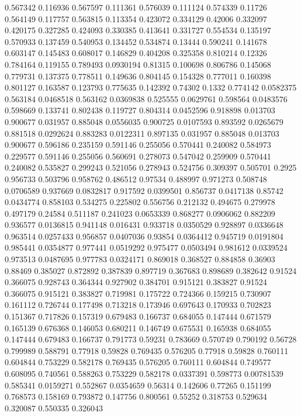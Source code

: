 0.567342 0.116936
0.567597 0.111361
0.576039 0.111124
0.574339 0.11726
0.564149 0.117757
0.563815 0.113354
0.423072 0.334129
0.42006 0.332097
0.420175 0.327285
0.424093 0.330385
0.413641 0.331727
0.554534 0.135197
0.570933 0.137459
0.540953 0.134452
0.534874 0.13444
0.590241 0.141678
0.603147 0.145483
0.608017 0.146829
0.404208 0.325358
0.810214 0.12326
0.784164 0.119155
0.789493 0.0930194
0.81315 0.100698
0.806786 0.145068
0.779731 0.137375
0.778511 0.149636
0.804145 0.154328
0.777011 0.160398
0.801127 0.163587
0.123793 0.775635
0.142392 0.74302
0.1332 0.774142
0.0582375 0.563184
0.0468518 0.563162
0.0369838 0.525555
0.0629761 0.598564
0.0483576 0.598669
0.133741 0.802438
0.119727 0.804314
0.0452596 0.918898
0.013703 0.900677
0.031957 0.885048
0.0556035 0.900725
0.0107593 0.893592
0.0265679 0.881518
0.0292624 0.883283
0.0122311 0.897135
0.031957 0.885048
0.013703 0.900677
0.596186 0.235159
0.591146 0.255056
0.570441 0.240082
0.584973 0.229577
0.591146 0.255056
0.560691 0.278073
0.547042 0.259909
0.570441 0.240082
0.535827 0.299243
0.521056 0.278943
0.524756 0.309397
0.505701 0.2925
0.956733 0.503796
0.958762 0.486512
0.97534 0.488997
0.971273 0.508748
0.0706589 0.937669
0.0832817 0.917592
0.0399501 0.856737
0.0417138 0.85742
0.0434774 0.858103
0.534275 0.225802
0.556756 0.212132
0.494675 0.279978
0.497179 0.24584
0.511187 0.241023
0.0653339 0.868277
0.0906062 0.882209
0.936577 0.0136815
0.941148 0.016431
0.933718 0.0350529
0.928897 0.0336648
0.963514 0.0257433
0.956857 0.0407036
0.93854 0.0364412
0.945719 0.0191804
0.985441 0.0354877
0.977441 0.0519292
0.975477 0.0503494
0.981612 0.0339524
0.973513 0.0487695
0.977783 0.0324171
0.869018 0.368527
0.884858 0.36903
0.88469 0.385027
0.872892 0.387839
0.897719 0.367683
0.898689 0.382642
0.91524 0.366075
0.928743 0.364344
0.927902 0.384701
0.915121 0.383827
0.91524 0.366075
0.915121 0.383827
0.719981 0.175722
0.724366 0.159215
0.730907 0.161112
0.726744 0.177498
0.713218 0.173946
0.697643 0.170933
0.702823 0.151367
0.717826 0.157319
0.679483 0.166737
0.684055 0.147444
0.671579 0.165139
0.676368 0.146053
0.680211 0.146749
0.675531 0.165938
0.684055 0.147444
0.679483 0.166737
0.791773 0.59231
0.783669 0.570749
0.790192 0.56728
0.799989 0.588791
0.77918 0.59828
0.769435 0.576205
0.77918 0.59828
0.760111 0.604844
0.753229 0.582178
0.769435 0.576205
0.760111 0.604844
0.749577 0.608095
0.740561 0.588263
0.753229 0.582178
0.0337391 0.598773
0.00781539 0.585341
0.0159271 0.552867
0.0354659 0.56314
0.142606 0.77265
0.151199 0.768573
0.158169 0.793872
0.147756 0.800561
0.55252 0.318753
0.529634 0.320087
0.550335 0.326043

